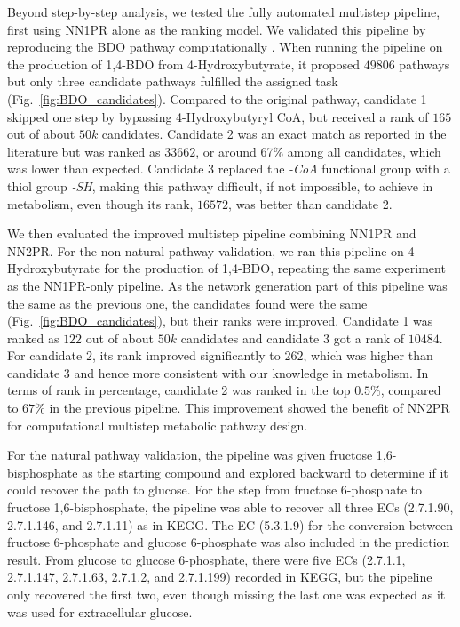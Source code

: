 \documentclass{article}
\begin{document}
Beyond step-by-step analysis, we tested the fully automated multistep pipeline, first using NN1PR alone as the ranking model.
We validated this pipeline by reproducing the BDO pathway computationally \citep{yim2011metabolic}.
When running the pipeline on the production of 1,4-BDO from 4-Hydroxybutyrate, it proposed $49806$ pathways but only three candidate pathways fulfilled the assigned task (Fig.~\ref{fig:BDO_candidates}).
Compared to the original pathway, candidate 1 skipped one step by bypassing 4-Hydroxybutyryl CoA, but received a rank of $165$ out of about $50k$ candidates.
Candidate 2 was an exact match as reported in the literature but was ranked as $33662$, or around 67\% among all candidates, which was lower than expected.
Candidate 3 replaced the \textit{-CoA} functional group with a thiol group \textit{-SH}, making this pathway difficult, if not impossible, to achieve in metabolism, even though its rank, $16572$, was better than candidate 2.  


We then evaluated the improved multistep pipeline combining NN1PR and NN2PR.
For the non-natural pathway validation, we ran this pipeline on 4-Hydroxybutyrate for the production of 1,4-BDO, repeating the same experiment as the NN1PR-only pipeline.
As the network generation part of this pipeline was the same as the previous one, the candidates found were the same (Fig.~\ref{fig:BDO_candidates}), but their ranks were improved.
Candidate 1 was ranked as $122$ out of about $50k$ candidates and candidate 3 got a rank of $10484$. 
For candidate 2, its rank improved significantly to $262$, which was higher than candidate 3 and hence more consistent with our knowledge in metabolism. 
In terms of rank in percentage, candidate 2 was ranked in the top $0.5\%$, compared to $67\%$ in the previous pipeline. 
This improvement showed the benefit of NN2PR for computational multistep metabolic pathway design.

For the natural pathway validation, the pipeline was given fructose 1,6-bisphosphate as the starting compound and explored backward to determine if it could recover the path to glucose.
For the step from fructose 6-phosphate to fructose 1,6-bisphosphate, the pipeline was able to recover all three ECs (2.7.1.90, 2.7.1.146, and 2.7.1.11) as in KEGG. 
The EC (5.3.1.9) for the conversion between fructose 6-phosphate and glucose 6-phosphate was also included in the prediction result. 
From glucose to glucose 6-phosphate, there were five ECs (2.7.1.1, 2.7.1.147, 2.7.1.63, 2.7.1.2, and 2.7.1.199) recorded in KEGG, but the pipeline only recovered the first two, even though missing the last one was expected as it was used for extracellular glucose. 
\end{document}
